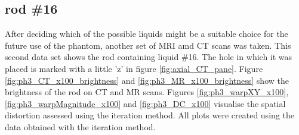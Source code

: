 \clearpage

\subsection{rod \#16}
\label{sec:rod16}

After deciding which of the possible liquids might be a suitable choice for the future use of the phantom, another set of MRI amd CT scans was taken.
This second data set shows the rod containing liquid \#16.
The hole in which it was placed is marked with a little 'z' in figure \ref{fig:axial_CT_pane}.
Figure \ref{fig:ph3_CT_x100_brightness} and \ref{fig:ph3_MR_x100_brightness} show the brightness of the rod on CT and MR scans.
Figures \ref{fig:ph3_warpXY_x100}, \ref{fig:ph3_warpMagnitude_x100} and \ref{fig:ph3_DC_x100} visualise the spatial distortion assessed using the iteration method.
All plots were created using the data obtained with the iteration method.


